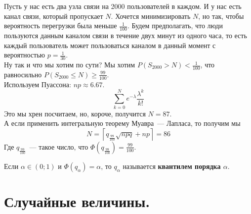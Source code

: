 \documentclass{article}
\begin{document}
    \begin{example}
        Пусть у нас есть два узла связи на 2000 пользователей в каждом. И у нас есть канал связи, который пропускает $N$. Хочется минимизировать $N$, но так, чтобы вероятность перегрузки была меньше $\frac1{100}$. Будем предполагать, что люди пользуются данным каналом связи в течение двух минут из одного часа, то есть каждый пользователь может пользоваться каналом в данный момент с вероятностью $p=\frac1{30}$.\\
        Ну так и что мы хотим по сути? Мы хотим $P(S_{2000}>N)<\frac1{100}$, что равносильно $P(S_{2000}\leqslant N)\geqslant\frac{99}{100}$.\\
        Используем Пуассона: $np\approx 6.67$.
        $$
        \sum\limits_{k=0}^Ne^{-\lambda}\frac{\lambda^k}{k!}
        $$
        Это мы хрен посчитаем, но, короче, получится $N=87$.\\
        А если применить интегральную теорему Муавра~--- Лапласа, то получим мы
        $$
        N=\left\lceil q_{\frac{99}{100}}\sqrt{npq}+np\right\rceil=86
        $$
        Где $q_{\frac{99}{100}}$~--- такое число, что $\Phi(q_{\frac{99}{100}})=\frac{99}{100}$.
    \end{example}
    \begin{definition}
        Если $\alpha\in(0;1)$ и $\Phi(q_\alpha)=\alpha$, то $q_\alpha$ называется \textbf{квантилем порядка $\alpha$}.
    \end{definition}
    \section{Случайные величины.}
\end{document}
